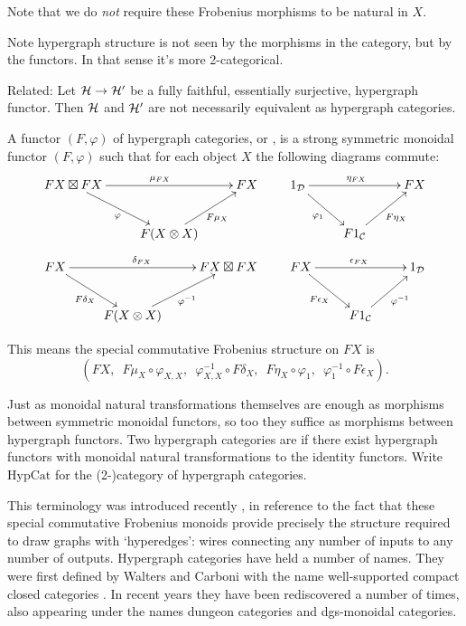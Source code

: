 Note that we do \emph{not} require these Frobenius morphisms to be natural in
$X$.

Note hypergraph structure is not seen by the morphisms in the
category, but by the functors. In that sense it's more 2-categorical.

Related: Let $\mathcal H \to \mathcal H'$ be a fully faithful, essentially surjective,
hypergraph functor. Then $\mathcal H$ and $\mathcal H'$ are not necessarily equivalent as
hypergraph categories.

\begin{definition}
A functor $(F,\varphi)$ of hypergraph categories, or , is a strong symmetric monoidal functor $(F,\varphi)$ such that for
each object $X$ the following diagrams commute:
\[
  \xymatrix{
    FX\boxtimes FX \ar[rr]^{\mu_{FX}} \ar[dr]_{\varphi} && FX \\
    & F(X \ot X) \ar[ur]_{F\mu_X}
  }
  \qquad
  \xymatrix{
    1_{\mc D} \ar[rr]^{\eta_{FX}} \ar[dr]_{\varphi_1} && FX \\
    & F1_{\mc C} \ar[ur]_{F\eta_X}
  }
\]
\[
  \xymatrix{
    FX \ar[rr]^{\delta_{FX}} \ar[dr]_{F\delta_X} && FX \boxtimes FX\\
    & F(X \ot X) \ar[ur]_{\varphi^{-1}}
  }
  \qquad
  \xymatrix{
    FX \ar[rr]^{\epsilon_{FX}} \ar[dr]_{F\epsilon_X} && 1_{\mc D} \\
    & F1_{\mc C} \ar[ur]_{\varphi^{-1}}
  }
\]
\end{definition}

This means the special commutative Frobenius structure on $FX$ is
\[
  (FX,\enspace F\mu_X \circ \varphi_{X,X},\enspace  \varphi^{-1}_{X,X} \circ F\delta_X,\enspace  F\eta_X \circ
  \varphi_1,\enspace  \varphi_1^{-1} \circ F\epsilon_X).
\]

Just as monoidal natural transformations themselves are enough as morphisms
between symmetric monoidal functors, so too they suffice as morphisms between
hypergraph functors. Two hypergraph categories are  if there exist hypergraph functors with
monoidal natural transformations to the identity functors. 
Write $\mathrm{HypCat}$ for the (2-)category of hypergraph categories.

\begin{remark}
  This terminology was introduced recently \cite{Ki}, in reference to the fact
that these special commutative Frobenius monoids provide precisely the structure
required to draw graphs with `hyperedges': wires connecting any number of
inputs to any number of outputs. Hypergraph categories have held a number of
names. They were first defined by Walters and Carboni with the name
well-supported compact closed categories \cite{Ca}. In recent years they have
been rediscovered a number of times, also appearing under the names dungeon
categories \cite{Mo} and dgs-monoidal categories. 
\end{remark}


